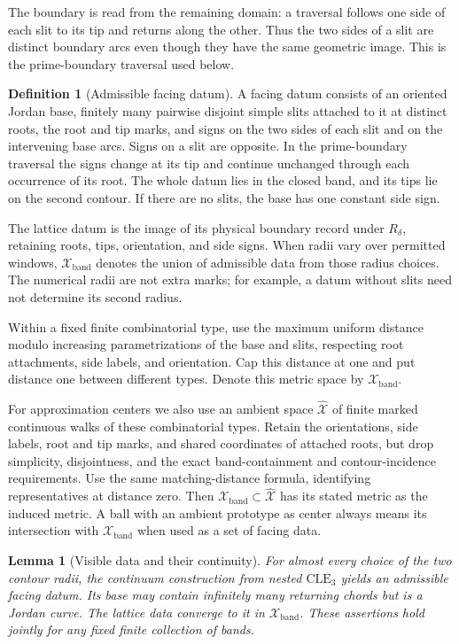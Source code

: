 \documentclass[11pt]{article}
\newtheorem{lemma}[theorem]{Lemma}
\theoremstyle{definition}
\newtheorem{definition}[theorem]{Definition}
\theoremstyle{remark}
\numberwithin{equation}{section}
\begin{document}
The boundary is read from the remaining domain: a traversal follows
one side of each slit to its tip and returns along the other.
Thus the two sides of a slit are distinct boundary arcs even though
they have the same geometric image. This is the prime-boundary
traversal used below.

\begin{definition}[Admissible facing datum]\label{if:datum}
A facing datum consists of an oriented Jordan base, finitely many
pairwise disjoint simple slits attached to it at distinct roots, the
root and tip marks, and signs on the two sides of each slit and on
the intervening base arcs.  Signs on a slit are opposite.  In the
prime-boundary traversal the signs change at its tip and continue
unchanged through each occurrence of its root.  The whole datum lies
in the closed band, and its tips lie on the second contour.  If there
are no slits, the base has one constant side sign.

The lattice datum is the image of its physical boundary record under
$R_\delta$, retaining roots, tips, orientation, and side signs.
When radii vary over permitted windows,
$\mathcal X_{\mathrm{band}}$ denotes the union of admissible data from
those radius choices. The numerical radii are not extra marks; for
example, a datum without slits need not determine its second radius.

Within a fixed finite combinatorial type, use the maximum uniform
distance modulo increasing parametrizations of the base and slits,
respecting root attachments, side labels, and orientation.  Cap this
distance at one and put distance one between different types.  Denote
this metric space by $\mathcal X_{\mathrm{band}}$.

For approximation centers we also use an ambient space
$\widehat{\mathcal X}$ of finite marked continuous walks of these
combinatorial types. Retain the orientations, side labels, root and tip
marks, and shared coordinates of attached roots, but drop simplicity,
disjointness, and the exact band-containment and contour-incidence
requirements. Use the same matching-distance formula, identifying
representatives at distance zero. Then
$\mathcal X_{\mathrm{band}}\subset\widehat{\mathcal X}$ has its
stated metric as the induced metric. A ball with an ambient prototype
as center always means its intersection with
$\mathcal X_{\mathrm{band}}$ when used as a set of facing data.
\end{definition}

\begin{lemma}[Visible data and their continuity]\label{if:visible-data}
For almost every choice of the two contour radii, the continuum
construction from nested $\mathrm{CLE}_3$ yields an admissible facing
datum.  Its base may contain infinitely many returning chords but is
a Jordan curve.  The lattice data converge to it in
$\mathcal X_{\mathrm{band}}$.  These assertions hold jointly for any
fixed finite collection of bands.
\end{lemma}
\end{document}
